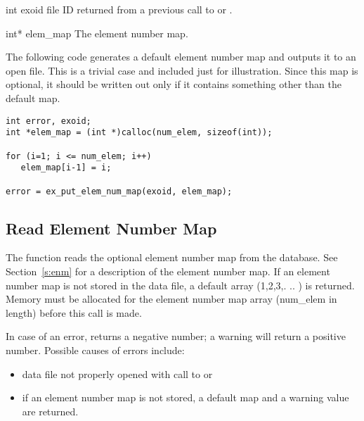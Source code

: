
\begin{parameters}
\item[{int exoid \R{}}]
\exo{} file ID returned from a previous call to  or
.

\item[{int* elem_map \R{}}]
The element number map.
\end{parameters}


The following code generates a default element number map and outputs
it to an open \exo{} file. This is a trivial case and included just
for illustration. Since this map is optional, it should be written out
only if it contains something other than the default map.

\begin{lstlisting}
int error, exoid;
int *elem_map = (int *)calloc(num_elem, sizeof(int));

for (i=1; i <= num_elem; i++)
   elem_map[i-1] = i;

error = ex_put_elem_num_map(exoid, elem_map);
\end{lstlisting}

\subsection{Read Element Number Map}

The function  reads the optional
element number map from the database. See Section~\ref{s:enm} for a
description of the element number map. If an element number map is not
stored in the data file, a default array (1,2,3,. .. ) is
returned. Memory must be allocated for the element number map array
({num_elem} in length) before this call is made.

In case of an error,  returns a
negative number; a warning will return a positive number.  Possible
causes of errors include:

\begin{itemize}
 \item data file not properly opened with call to 
 or 

 \item if an element number map is not stored, a default map and a
 warning value are returned.
\end{itemize}



